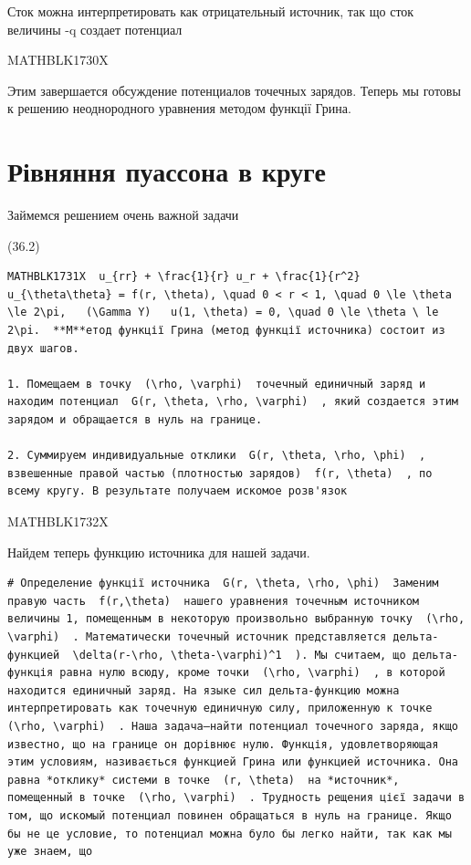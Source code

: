 \documentclass[
  ukrainian,
]{article}
\begin{document}
Сток можна интерпретировать как отрицательный источник, так що сток
величины -q создает потенциал

MATHBLK1730X

Этим завершается обсуждение потенциалов точечных зарядов. Теперь мы
готовы к решению неоднородного уравнения методом функції Грина.

\section{Рівняння пуассона в
круге}\label{ux440ux456ux432ux43dux44fux43dux43dux44f-ux43fux443ux430ux441ux441ux43eux43dux430-ux432-ux43aux440ux443ux433ux435}

Займемся решением очень важной задачи

(36.2)

\begin{verbatim}
MATHBLK1731X  u_{rr} + \frac{1}{r} u_r + \frac{1}{r^2} u_{\theta\theta} = f(r, \theta), \quad 0 < r < 1, \quad 0 \le \theta \le 2\pi,   (\Gamma Y)   u(1, \theta) = 0, \quad 0 \le \theta \ le 2\pi.  **М**етод функції Грина (метод функції источника) состоит из двух шагов.

1. Помещаем в точку  (\rho, \varphi)  точечный единичный заряд и находим потенциал  G(r, \theta, \rho, \varphi)  , який создается этим зарядом и обращается в нуль на границе.

2. Суммируем индивидуальные отклики  G(r, \theta, \rho, \phi)  , взвешенные правой частью (плотностью зарядов)  f(r, \theta)  , по всему кругу. В результате получаем искомое розв'язок
\end{verbatim}

MATHBLK1732X

Найдем теперь функцию источника для нашей задачи.

\begin{verbatim}
# Определение функції источника  G(r, \theta, \rho, \phi)  Заменим правую часть  f(r,\theta)  нашего уравнения точечным источником величины 1, помещенным в некоторую произвольно выбранную точку  (\rho, \varphi)  . Математически точечный источник представляется дельта-функцией  \delta(r-\rho, \theta-\varphi)^1  ). Мы считаем, що дельта-функція равна нулю всюду, кроме точки  (\rho, \varphi)  , в которой находится единичный заряд. На языке сил дельта-функцию можна интерпретировать как точечную единичную силу, приложенную к точке  (\rho, \varphi)  . Наша задача—найти потенциал точечного заряда, якщо известно, що на границе он дорівнює нулю. Функція, удовлетворяющая этим условиям, називається функцией Грина или функцией источника. Она равна *отклику* системи в точке  (r, \theta)  на *источник*, помещенный в точке  (\rho, \varphi)  . Трудность рещения цієї задачи в том, що искомый потенциал повинен обращаться в нуль на границе. Якщо бы не це условие, то потенциал можна було бы легко найти, так как мы уже знаем, що
\end{verbatim}
\end{document}
